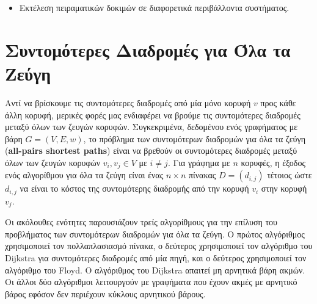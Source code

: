 \documentclass[12pt,a4paper]{article} %
\begin{document}
{\begin{itemize}
Η διαδικασία είναι η εξής:
    \begin{enumerate}
    \item Προσθήκη της κορυφής πηγής στον σωρό και αναπροσαρμογή του σωρού.
    \item Επιλογή του κορυφαίου στοιχείου $u$ και διαγραφή του από τον σωρό.
    \item Επεξεργασία των κορυφών που είναι γειτονικές του $u$: αν μια κορυφή βρίσκεται στην ουρά, ενημέρωση της απόστασης και αναπροσαρμογή της θέσης του στοιχείου στον σωρό. Αν η κορυφή δεν βρίσκεται στον σωρό, προσθήκη της στον σωρό και αναπροσαρμογή του σωρού.
    \item Αν το προκύπτον $u$ είναι το τελικό σημείο, τερματίζει ο αλγόριθμος. Αλλιώς επανάληψη των βημάτων 2 και 3.
    \end{enumerate}
    Η πολυπλοκότητα με χρήση δυαδικού σωρού απαιτεί $O((|E|+|V|)\log|V|)$. Ο σωρός Fibonacci βελτιώνει αυτό σε $O(|E| + |V|\log|V|)$.

\item Εκτέλεση πειραματικών δοκιμών σε διαφορετικά περιβάλλοντα συστήματος.
\end{itemize}

\section{Συντομότερες Διαδρομές για Όλα τα Ζεύγη}
Αντί να βρίσκουμε τις συντομότερες διαδρομές από μία μόνο κορυφή $v$ προς κάθε άλλη κορυφή, μερικές φορές μας ενδιαφέρει να βρούμε τις συντομότερες διαδρομές μεταξύ όλων των ζευγών κορυφών. Συγκεκριμένα, δεδομένου ενός γραφήματος με βάρη $G=(V,E,w)$, το πρόβλημα των συντομότερων διαδρομών για όλα τα ζεύγη (\textbf{all-pairs shortest paths}) είναι να βρεθούν οι συντομότερες διαδρομές μεταξύ όλων των ζευγών κορυφών $v_i, v_j \in V$ με $i \neq j$. Για γράφημα με $n$ κορυφές, η έξοδος ενός αλγορίθμου για όλα τα ζεύγη είναι ένας $n \times n$ πίνακας $D=(d_{i,j})$ τέτοιος ώστε $d_{i,j}$ να είναι το κόστος της συντομότερης διαδρομής από την κορυφή $v_i$ στην κορυφή $v_j$.

Οι ακόλουθες ενότητες παρουσιάζουν τρείς αλγορίθμους για την επίλυση του προβλήματος των συντομότερων διαδρομών για όλα τα ζεύγη. Ο πρώτος αλγόριθμος χρησιμοποιεί τον πολλαπλασιασμό πίνακα, ο δεύτερος χρησιμοποιεί τον αλγόριθμο του Dijkstra για συντομότερες διαδρομές από μία πηγή, και ο δεύτερος χρησιμοποιεί τον αλγόριθμο του Floyd. Ο αλγόριθμος του Dijkstra απαιτεί μη αρνητικά βάρη ακμών. Οι άλλοι δύο αλγόριθμοι λειτουργούν με γραφήματα που έχουν ακμές με αρνητικό βάρος εφόσον δεν περιέχουν κύκλους αρνητικού βάρους.

}
\end{document}
